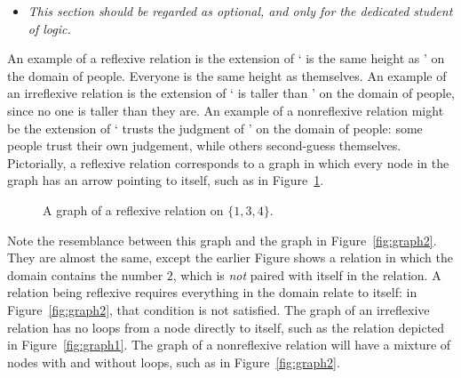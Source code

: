 \begin{itemize}
 	\item \emph{This section should be regarded as optional, and only for the dedicated student of logic.}
 \end{itemize} 

An example of a reflexive relation is the extension of ` is the same height as ' on the domain of people. Everyone is the same height as themselves. An example of an irreflexive relation is the extension of ` is taller than ' on the domain of people, since no one is taller than they are. An example of a nonreflexive relation might be the extension of ` trusts the judgment of ' on the domain of people: some people trust their own judgement, while others second-guess themselves. Pictorially, a reflexive relation corresponds to a graph in which every node in the graph has an arrow pointing to itself, such as in Figure~\ref{fig:reflex}. 
\begin{figure}[t]
\caption{A graph of a reflexive relation on $\{1, 3, 4\}$.\label{fig:reflex}}
\end{figure} Note the resemblance between this graph and the graph in Figure~\ref{fig:graph2}. They are almost the same, except the earlier Figure shows a relation in which the domain contains the number $2$, which is \emph{not} paired with itself in the relation. A relation being reflexive requires everything in the domain relate to itself: in Figure~\ref{fig:graph2}, that condition is not satisfied.  The graph of an irreflexive relation has no loops from a node directly to itself, such as the relation depicted in Figure~\ref{fig:graph1}. The graph of a nonreflexive relation will have a mixture of nodes with and without loops, such as in Figure~\ref{fig:graph2}.

